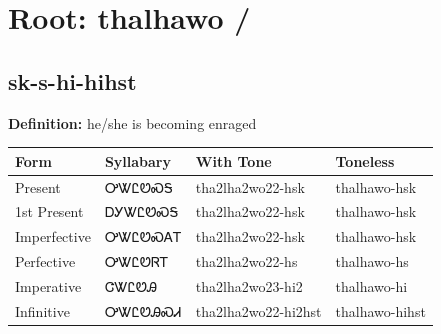 \documentclass{article}%
\begin{document}
%
\normalsize%
\section*{Root: thalhawo / }%
\subsection*{sk-s-hi-hihst}%
\textbf{Definition: }%
he/she is becoming enraged%
\\[0.5em]%
\begin{tabular}{|l|l|l|l|}%
\hline%
\textbf{Form}&\textbf{Syllabary}&\textbf{With Tone}&\textbf{Toneless}\\%
\hline%
Present&ᎤᏔᏝᏬᏍᎦ&tha2lha2wo22{-}hsk&thalhawo{-}hsk\\%
1st Present&ᎠᎩᏔᏝᏬᏍᎦ&tha2lha2wo22{-}hsk&thalhawo{-}hsk\\%
Imperfective&ᎤᏔᏝᏬᏍᎪᎢ&tha2lha2wo22{-}hsk&thalhawo{-}hsk\\%
Perfective&ᎤᏔᏝᏬᏒᎢ&tha2lha2wo22{-}hs&thalhawo{-}hs\\%
Imperative&ᏣᏔᏝᏬᎯ&tha2lha2wo23{-}hi2&thalhawo{-}hi\\%
Infinitive&ᎤᏔᏝᏬᎯᏍᏗ&tha2lha2wo22{-}hi2hst&thalhawo{-}hihst\\%
\hline%
\end{tabular}%
\\[1em]%
\end{document}
